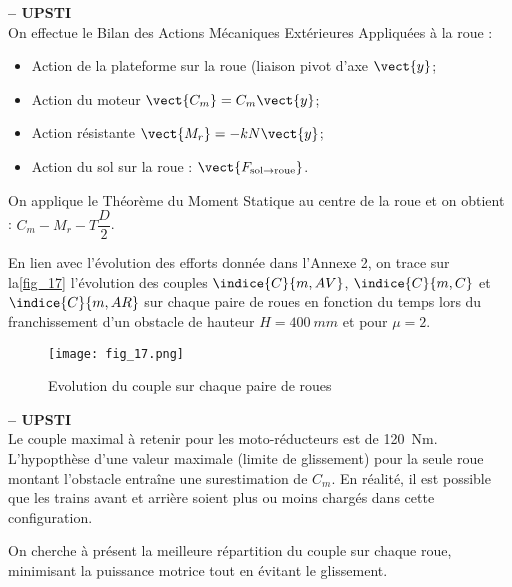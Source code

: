 \ifprof
\begin{corrige}\textbf{ -- UPSTI}\\ 
On effectue le Bilan des Actions Mécaniques Extérieures Appliquées à la roue :
\begin{itemize}
\item Action de la plateforme sur la roue (liaison pivot d’axe $\vect{y}$;
\item Action du moteur $\vect{C_m}=C_m\vect{y}$;
\item Action résistante $\vect{M_r}=-kN\vect{y}$;
\item Action du sol sur la roue : $\vect{F_{\text{sol} \rightarrow \text{roue}}}$.
\end{itemize}

On applique le Théorème du Moment Statique au centre de la roue et on obtient :
$C_m - M_r - T\dfrac{D}{2}$.

\end{corrige}
\else
\fi
\ifprof
\else
En lien avec l'évolution des efforts donnée dans l'Annexe 2, on trace sur la\autoref{fig_17} l'évolution
des couples $\indice{C}{m, AV}$, $\indice{C}{m,C}$ et $\indice{C}{m,AR}$ sur chaque paire de roues en fonction du temps lors du franchissement d'un obstacle de hauteur $H =\SI{400}{mm}$ et pour $\mu=2$.

\begin{figure}[H]
\centering
\texttt{[image: fig\_17.png]}
\caption{Evolution du couple sur chaque paire de roues\label{fig_17}}
\end{figure}
\fi


\ifprof
\begin{corrige}\textbf{ -- UPSTI}\\ 
Le couple maximal à retenir pour les moto-réducteurs est de \SI{120}{Nm}.
L’hypopthèse d’une valeur maximale (limite de glissement) pour la seule roue montant l’obstacle entraîne une surestimation de $C_m$. En réalité, il est possible que les trains avant et arrière soient plus ou moins chargés dans cette configuration.
\end{corrige}
\else
\fi

On cherche à présent la meilleure répartition du couple sur chaque roue, minimisant la puissance
motrice tout en évitant le glissement.

